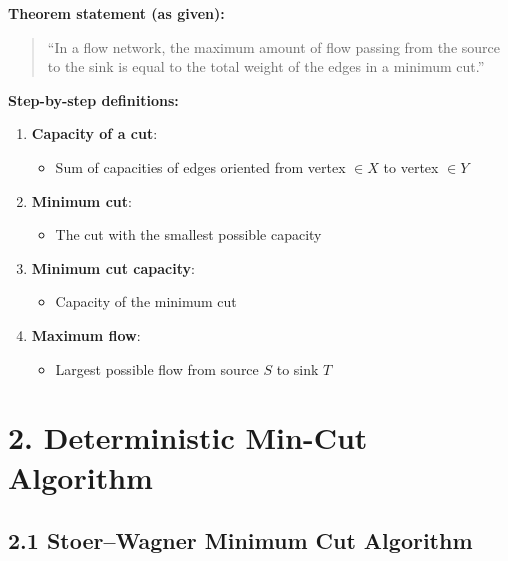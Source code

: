 \documentclass[11pt]{article}
\begin{document}
\textbf{Theorem statement (as given):}

\begin{quote}
“In a flow network, the maximum amount of flow passing from the source to the sink is equal to the total weight of the edges in a minimum cut.”
\end{quote}

\textbf{Step-by-step definitions:}
\begin{enumerate}
    \item \textbf{Capacity of a cut}:
    \begin{itemize}
        \item Sum of capacities of edges oriented from vertex \( \in X \) to vertex \( \in Y \)
    \end{itemize}
    \item \textbf{Minimum cut}:
    \begin{itemize}
        \item The cut with the smallest possible capacity
    \end{itemize}
    \item \textbf{Minimum cut capacity}:
    \begin{itemize}
        \item Capacity of the minimum cut
    \end{itemize}
    \item \textbf{Maximum flow}:
    \begin{itemize}
        \item Largest possible flow from source \( S \) to sink \( T \)
    \end{itemize}
\end{enumerate}

\section*{2. Deterministic Min-Cut Algorithm}

\subsection*{2.1 Stoer–Wagner Minimum Cut Algorithm}
\end{document}
